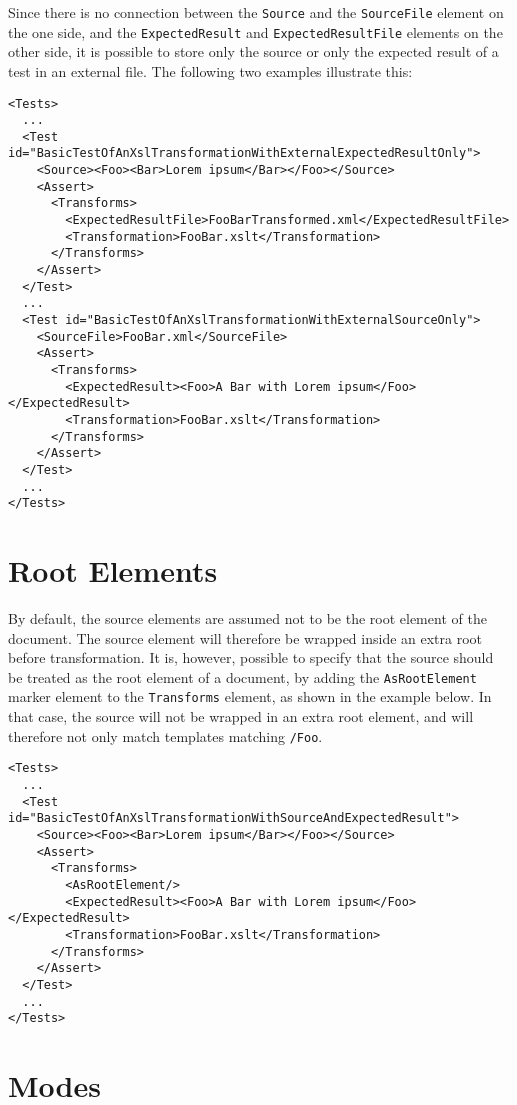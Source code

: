 Since there is no connection between the {\tt Source} and the {\tt SourceFile} element on the one side, and the {\tt ExpectedResult} and {\tt ExpectedResultFile} elements on the other side, it is possible to store only the source or only the expected result of a test in an external file. The following two examples illustrate this:
\begin{verbatim}
<Tests>
  ...
  <Test id="BasicTestOfAnXslTransformationWithExternalExpectedResultOnly">
    <Source><Foo><Bar>Lorem ipsum</Bar></Foo></Source>
    <Assert>
      <Transforms>
        <ExpectedResultFile>FooBarTransformed.xml</ExpectedResultFile>
        <Transformation>FooBar.xslt</Transformation>
      </Transforms>
    </Assert>    
  </Test>
  ...
  <Test id="BasicTestOfAnXslTransformationWithExternalSourceOnly">
    <SourceFile>FooBar.xml</SourceFile>
    <Assert>
      <Transforms>
        <ExpectedResult><Foo>A Bar with Lorem ipsum</Foo></ExpectedResult>
        <Transformation>FooBar.xslt</Transformation>
      </Transforms>
    </Assert>    
  </Test>
  ...
</Tests>
\end{verbatim}

\section{Root Elements}

By default, the source elements are assumed not to be the root element of the document. The source element will therefore be wrapped inside an extra root before transformation. It is, however, possible to specify that the source should be treated as the root element of a document, by adding the {\tt AsRootElement} marker element to the {\tt Transforms} element, as shown in the example below. In that case, the source will not be wrapped in an extra root element, and will therefore not only match templates matching {\tt /Foo}.
\begin{verbatim}
<Tests>
  ...
  <Test id="BasicTestOfAnXslTransformationWithSourceAndExpectedResult">
    <Source><Foo><Bar>Lorem ipsum</Bar></Foo></Source>
    <Assert>
      <Transforms>
        <AsRootElement/>
        <ExpectedResult><Foo>A Bar with Lorem ipsum</Foo></ExpectedResult>
        <Transformation>FooBar.xslt</Transformation>
      </Transforms>
    </Assert>    
  </Test>
  ...
</Tests>
\end{verbatim}

\section{Modes}

